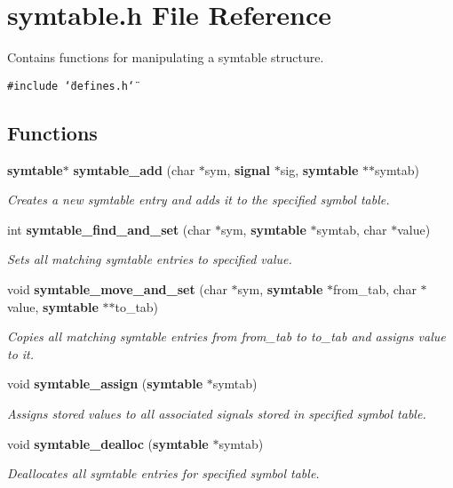 \section{symtable.h File Reference}
\label{symtable_8h}
Contains functions for manipulating a symtable structure. 


{\tt \#include \char`\"{}defines.h\char`\"{}}\par
\subsection*{Functions}
\begin{CompactItemize}
\item 
{\bf symtable}$\ast$ {\bf symtable\_\-add} (char $\ast$sym, {\bf signal} $\ast$sig, {\bf symtable} $\ast$$\ast$symtab)
\begin{CompactList}\small\item\em Creates a new symtable entry and adds it to the specified symbol table.\item\end{CompactList}\item 
int {\bf symtable\_\-find\_\-and\_\-set} (char $\ast$sym, {\bf symtable} $\ast$symtab, char $\ast$value)
\begin{CompactList}\small\item\em Sets all matching symtable entries to specified value.\item\end{CompactList}\item 
void {\bf symtable\_\-move\_\-and\_\-set} (char $\ast$sym, {\bf symtable} $\ast$from\_\-tab, char $\ast$value, {\bf symtable} $\ast$$\ast$to\_\-tab)
\begin{CompactList}\small\item\em Copies all matching symtable entries from from\_\-tab to to\_\-tab and assigns value to it.\item\end{CompactList}\item 
void {\bf symtable\_\-assign} ({\bf symtable} $\ast$symtab)
\begin{CompactList}\small\item\em Assigns stored values to all associated signals stored in specified symbol table.\item\end{CompactList}\item 
void {\bf symtable\_\-dealloc} ({\bf symtable} $\ast$symtab)
\begin{CompactList}\small\item\em Deallocates all symtable entries for specified symbol table.\item\end{CompactList}\end{CompactItemize}


